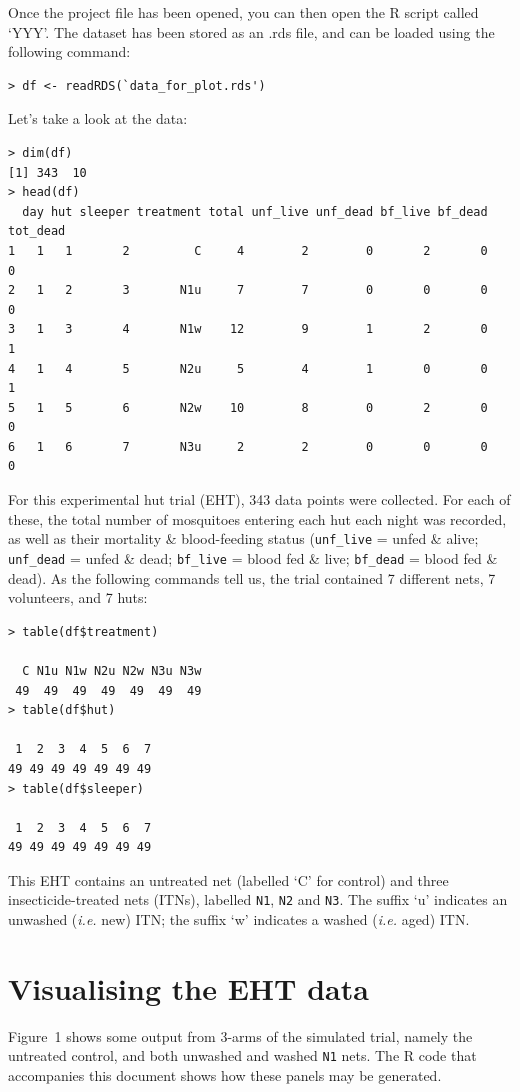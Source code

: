 \documentclass[11pt]{article}
\begin{document}
Once the project file has been opened, you can then open the R script called `YYY'. The dataset has been stored as an .rds file, and can be loaded using the following command:
\begin{verbatim}
> df <- readRDS(`data_for_plot.rds')
\end{verbatim}
Let's take a look at the data:
\begin{verbatim}
> dim(df)
[1] 343  10
> head(df)
  day hut sleeper treatment total unf_live unf_dead bf_live bf_dead tot_dead
1   1   1       2         C     4        2        0       2       0        0
2   1   2       3       N1u     7        7        0       0       0        0
3   1   3       4       N1w    12        9        1       2       0        1
4   1   4       5       N2u     5        4        1       0       0        1
5   1   5       6       N2w    10        8        0       2       0        0
6   1   6       7       N3u     2        2        0       0       0        0
\end{verbatim}
For this experimental hut trial (EHT), 343 data points were collected. For each of these, the total number of mosquitoes entering each hut each night was recorded, as well as their mortality \& blood-feeding status (\verb+unf_live+ = unfed \& alive; \verb+unf_dead+ = unfed \& dead; \verb+bf_live+ = blood fed \& live; \verb+bf_dead+ = blood fed \& dead). As the following commands tell us, the trial contained 7 different nets, 7 volunteers, and 7 huts:
\begin{verbatim}
> table(df$treatment)

  C N1u N1w N2u N2w N3u N3w 
 49  49  49  49  49  49  49 
> table(df$hut)

 1  2  3  4  5  6  7 
49 49 49 49 49 49 49 
> table(df$sleeper)

 1  2  3  4  5  6  7 
49 49 49 49 49 49 49 
\end{verbatim}
This EHT contains an untreated net (labelled `C' for control) and three insecticide-treated nets (ITNs), labelled \verb+N1+, \verb+N2+ and \verb+N3+. The suffix `u' indicates an unwashed (\textit{i.e.} new) ITN; the suffix `w' indicates a washed (\textit{i.e.} aged) ITN.

\section{Visualising the EHT data}

Figure~1 shows some output from 3-arms of the simulated trial, namely the untreated control, and both unwashed and washed \verb+N1+ nets. The R code that accompanies this document shows how these panels may be generated.
\end{document}
